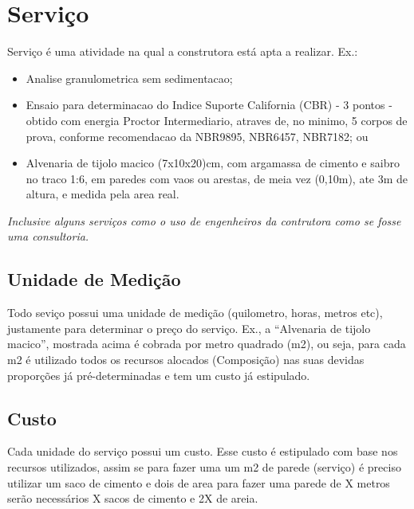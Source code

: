 \chapter{Serviço}

Serviço é uma atividade na qual a construtora está apta a realizar. Ex.:

\begin{itemize}
	\item Analise granulometrica sem sedimentacao;
	\item Ensaio para determinacao do Indice Suporte California (CBR) - 3 pontos - obtido com energia Proctor Intermediario, atraves de, no minimo, 5 corpos de prova, conforme recomendacao da NBR9895, NBR6457, NBR7182; ou
	\item Alvenaria de tijolo macico (7x10x20)cm, com argamassa de cimento e saibro no traco 1:6, em paredes com vaos ou arestas, de meia vez (0,10m), ate 3m de altura, e medida pela area real.
\end{itemize}

\emph{Inclusive alguns serviços como o uso de engenheiros da contrutora como se fosse uma consultoria.}

\section{Unidade de Medição}

Todo seviço possui uma unidade de medição (quilometro, horas, metros etc), justamente para determinar o preço do serviço. Ex., a ``Alvenaria de tijolo macico'', mostrada acima é cobrada por metro quadrado (m2), ou seja, para cada m2 é utilizado todos os recursos alocados (Composição) nas suas devidas proporções já pré-determinadas e tem um custo já estipulado.

\section{Custo}

Cada unidade do serviço possui um custo. Esse custo é estipulado com base nos recursos utilizados, assim se para fazer uma um m2 de parede (serviço) é preciso utilizar um saco de cimento e dois de area para fazer uma parede de X metros serão necessários X sacos de cimento e 2X de areia.